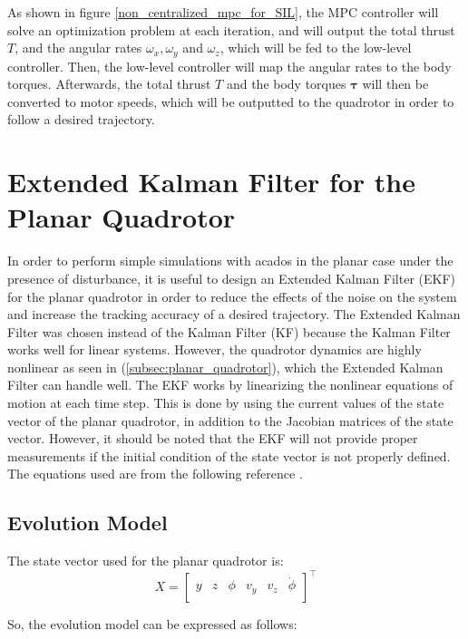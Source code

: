 \documentclass{thesisreport}
\begin{document}
As shown in figure \ref{non_centralized_mpc_for_SIL}, the MPC controller will solve an optimization problem at each iteration, and will output the total thrust $T$, and the angular rates $\omega_x, \omega_y$ and $\omega_z$, which will be fed to the low-level controller. Then, the low-level controller will map the angular rates to the body torques. Afterwards, the total thrust $T$ and the body torques $\bm{\tau}$ will then be converted to motor speeds, which will be outputted to the quadrotor in order to follow a desired trajectory.

\section{Extended Kalman Filter for the Planar Quadrotor}
In order to perform simple simulations with acados in the planar case under the presence of disturbance, it is useful to design an Extended Kalman Filter (EKF) for the planar quadrotor in order to reduce the effects of the noise on the system and increase the tracking accuracy of a desired trajectory. The Extended Kalman Filter was chosen instead of the Kalman Filter (KF) because the Kalman Filter works well for linear systems. However, the quadrotor dynamics are highly  nonlinear as seen in (\ref{subsec:planar_quadrotor}), which the Extended Kalman Filter can handle well. The EKF works by linearizing the nonlinear equations of motion at each time step. This is done by using the current values of the state vector of the planar quadrotor, in addition to the Jacobian matrices of the state vector. However, it should be noted that the EKF will not provide proper measurements if the initial condition of the state vector is not properly defined. The equations used are from the following reference \cite{AUVE2020}.

\subsection{Evolution Model}

The state vector used for the planar quadrotor is: 
\begin{equation}\label{planar_drone_states}
	X = \begin{bmatrix}
		y & z & \phi & v_y & v_z & \dot{\phi} \\ 
	\end{bmatrix}^{\intercal}
\end{equation}

So, the evolution model can be expressed as follows: 
\end{document}
